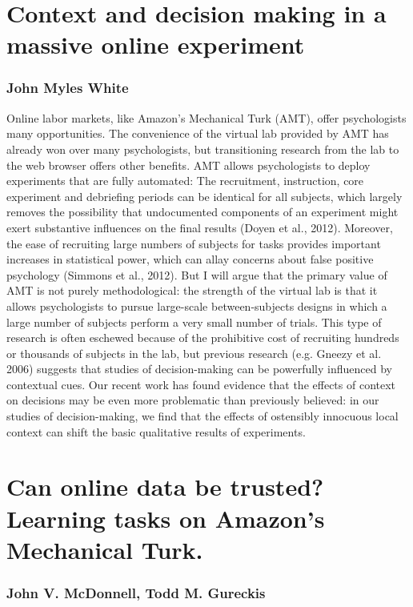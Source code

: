 \documentclass[10pt,letterpaper]{article}
\begin{document}
\section{Context and decision making in a massive online experiment}
\subsubsection{John Myles White}

Online labor markets, like Amazon's Mechanical Turk (AMT), offer psychologists
many opportunities.  The convenience of the virtual lab provided by AMT has
already won over many psychologists, but transitioning research from the lab to
the web browser offers other benefits. AMT allows psychologists to deploy
experiments that are fully automated: The recruitment, instruction, core
experiment and debriefing periods can be identical for all subjects, which
largely removes the possibility that undocumented components of an experiment
might exert substantive influences on the final results (Doyen et al., 2012).
\nocite{Doyen} Moreover, the ease of recruiting large numbers of subjects for
tasks provides important increases in statistical power, which can allay concerns
about false positive psychology (Simmons et al., 2012).  \nocite{Simmons} But I
will argue that the primary value of AMT is not purely methodological: the
strength of the virtual lab is that it allows psychologists to pursue large-scale
between-subjects designs in which a large number of subjects perform a very small
number of trials.  This type of research is often eschewed because of the
prohibitive cost of recruiting hundreds or thousands of subjects in the lab, but
previous research (e.g. Gneezy et al. 2006) \nocite{Gneezy} suggests that studies
of decision-making can be powerfully influenced by contextual cues.  Our recent
work has found evidence that the effects of context on decisions may be even more
problematic than previously believed: in our studies of decision-making, we find
that the effects of ostensibly innocuous local context can shift the basic
qualitative results of experiments.

\section{Can online data be trusted? Learning tasks on Amazon's Mechanical Turk.}
\subsubsection{John V. McDonnell, Todd M. Gureckis}
\end{document}
